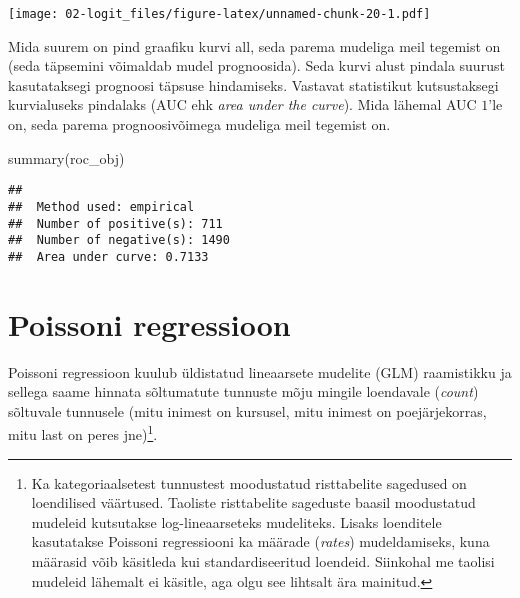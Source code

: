 \documentclass[
]{book}
\newenvironment{Shaded}{\begin{snugshade}}{\end{snugshade}}
\newcommand{\FunctionTok}[1]{\textcolor[rgb]{0.00,0.00,0.00}{#1}}
\newcommand{\NormalTok}[1]{#1}
\begin{document}
\texttt{[image: 02-logit\_files/figure-latex/unnamed-chunk-20-1.pdf]}

Mida suurem on pind graafiku kurvi all, seda parema mudeliga meil tegemist on (seda täpsemini võimaldab mudel prognoosida). Seda kurvi alust pindala suurust kasutataksegi prognoosi täpsuse hindamiseks. Vastavat statistikut kutsustaksegi kurvialuseks pindalaks (AUC ehk \emph{area under the curve}). Mida lähemal AUC \(1\)'le on, seda parema prognoosivõimega mudeliga meil tegemist on.

\begin{Shaded}
\begin{Highlighting}[]
\FunctionTok{summary}\NormalTok{(roc\_obj)}
\end{Highlighting}
\end{Shaded}

\begin{verbatim}
##                             
##  Method used: empirical     
##  Number of positive(s): 711 
##  Number of negative(s): 1490
##  Area under curve: 0.7133
\end{verbatim}

\hypertarget{poissoni-regressioon}{%
\chapter{Poissoni regressioon}\label{poissoni-regressioon}}

Poissoni regressioon kuulub üldistatud lineaarsete mudelite (GLM) raamistikku ja sellega saame hinnata sõltumatute tunnuste mõju mingile loendavale (\emph{count}) sõltuvale tunnusele (mitu inimest on kursusel, mitu inimest on poejärjekorras, mitu last on peres jne)\footnote{Ka kategoriaalsetest tunnustest moodustatud risttabelite sagedused on loendilised väärtused. Taoliste risttabelite sageduste baasil moodustatud mudeleid kutsutakse log-lineaarseteks mudeliteks. Lisaks loenditele kasutatakse Poissoni regressiooni ka määrade (\emph{rates}) mudeldamiseks, kuna määrasid võib käsitleda kui standardiseeritud loendeid. Siinkohal me taolisi mudeleid lähemalt ei käsitle, aga olgu see lihtsalt ära mainitud.}.
\end{document}

